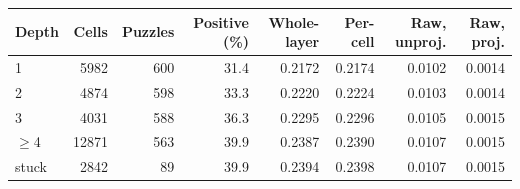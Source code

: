 \begin{tabular}{lrrrrrrr}
\toprule
Depth & Cells & Puzzles & Positive (\%) & Whole-layer & Per-cell & Raw, unproj. & Raw, proj. \\
\midrule
1 & 5982 & 600 & 31.4 & 0.2172 & 0.2174 & 0.0102 & 0.0014 \\
2 & 4874 & 598 & 33.3 & 0.2220 & 0.2224 & 0.0103 & 0.0014 \\
3 & 4031 & 588 & 36.3 & 0.2295 & 0.2296 & 0.0105 & 0.0015 \\
$\ge$4 & 12871 & 563 & 39.9 & 0.2387 & 0.2390 & 0.0107 & 0.0015 \\
stuck & 2842 & 89 & 39.9 & 0.2394 & 0.2398 & 0.0107 & 0.0015 \\
\bottomrule
\end{tabular}
